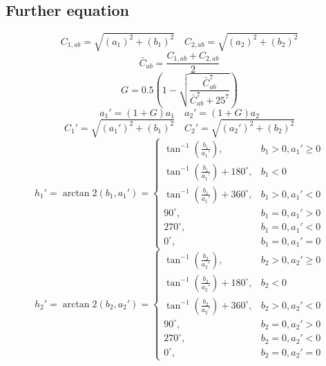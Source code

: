 \pagestyle{plain}
\begin{appendices}
	
\section{Further equation}\label{further equation}
\begin{equation}
C_{1,ab}=\sqrt{(a_{1})^{2}+(b_{1})^{2}} \quad C_{2,ab}=\sqrt{(a_{2})^{2}+(b_{2})^{2}}
\end{equation}
\begin{equation}
\bar{C}_{ab}=\frac{C_{1,ab}+C_{2,ab}}{2}
\end{equation}
\begin{equation}
G = 0.5\left(1-\sqrt{\frac{\bar{C}_{ab}^{7}}{\bar{C}_{ab}^{7}+25^7}}\right)
\end{equation}
\begin{equation}
a_{1}'=(1+G)a_{1} \quad a_{2}'=(1+G)a_{2} 
\end{equation}
\begin{equation}
C_{1}'=\sqrt{(a_{1}')^{2}+(b_{1})^2} \quad C_{2}'=\sqrt{(a_{2}')^{2}+(b_{2})^2}
\end{equation}
\begin{equation}
h_{1}' = \arctan2(b_{1},a_{1}') =
\begin{cases}
\tan^{-1}(\frac{b_{1}}{a_{1}'}), & b_{1}>0,a_{1}' \geq 0\\
\tan^{-1}(\frac{b_{1}}{a_{1}'})+180^{\circ}, & b_{1}<0\\
\tan^{-1}(\frac{b_{1}}{a_{1}'})+360^{\circ}, & b_{1}>0,a_{1}'<0 \\
90^{\circ}, & b_{1}=0,a_{1}'>0\\
270^{\circ}, & b_{1}=0,a_{1}'<0\\
0^{\circ}, & b_{1}=0,a_{1}'=0
\end{cases}
\end{equation}
\begin{equation}
h_{2}' = \arctan2(b_{2},a_{2}') =
\begin{cases}
\tan^{-1}\left(\frac{b_{2}}{a_{2}'}\right), & b_{2}>0,a_{2}' \geq 0\\
\tan^{-1}\left(\frac{b_{2}}{a_{2}'}\right)+180^{\circ}, & b_{2}<0\\
\tan^{-1}\left(\frac{b_{2}}{a_{2}'}\right)+360^{\circ}, & b_{2}>0,a_{2}'<0 \\
90^{\circ}, & b_{2}=0,a_{2}'>0\\
270^{\circ}, & b_{2}=0,a_{2}'<0\\
0^{\circ}, & b_{2}=0,a_{2}'=0

\end{cases}
\end{equation}
\end{appendices}
